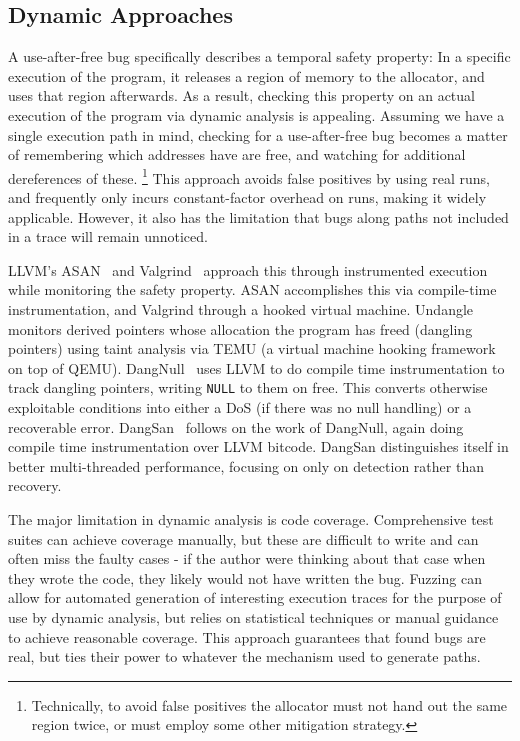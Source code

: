 \subsection{Dynamic Approaches}
A use-after-free bug specifically describes a temporal safety property:
In a specific execution of the program, it releases a region of memory to the allocator, and uses that region afterwards.
As a result, checking this property on an actual execution of the program via dynamic analysis is appealing.
Assuming we have a single execution path in mind, checking for a use-after-free bug becomes a matter of remembering which addresses have are free, and watching for additional dereferences of these.
\footnote{Technically, to avoid false positives the allocator must not hand out the same region twice, or must employ some other mitigation strategy.}
This approach avoids false positives by using real runs, and frequently only incurs constant-factor overhead on runs, making it widely applicable.
However, it also has the limitation that bugs along paths not included in a trace will remain unnoticed.

LLVM's ASAN~\cite{asan} and Valgrind~\cite{valgrind} approach this through instrumented execution while monitoring the safety property.
ASAN accomplishes this via compile-time instrumentation, and Valgrind through a hooked virtual machine.
Undangle~\cite{undangle} monitors derived pointers whose allocation the program has freed (dangling pointers) using taint analysis via TEMU (a virtual machine hooking framework on top of QEMU).
DangNull~\cite{dangnull} uses LLVM to do compile time instrumentation to track dangling pointers, writing \texttt{NULL} to them on free.
This converts otherwise exploitable conditions into either a DoS (if there was no null handling) or a recoverable error.
DangSan~\cite{dangsan} follows on the work of DangNull, again doing compile time instrumentation over LLVM bitcode.
DangSan distinguishes itself in better multi-threaded performance, focusing on only on detection rather than recovery.

The major limitation in dynamic analysis is code coverage.
Comprehensive test suites can achieve coverage manually, but these are difficult to write and can often miss the faulty cases - if the author were thinking about that case when they wrote the code, they likely would not have written the bug.
Fuzzing can allow for automated generation of interesting execution traces for the purpose of use by dynamic analysis, but relies on statistical techniques or manual guidance to achieve reasonable coverage.
This approach guarantees that found bugs are real, but ties their power to whatever the mechanism used to generate paths.

